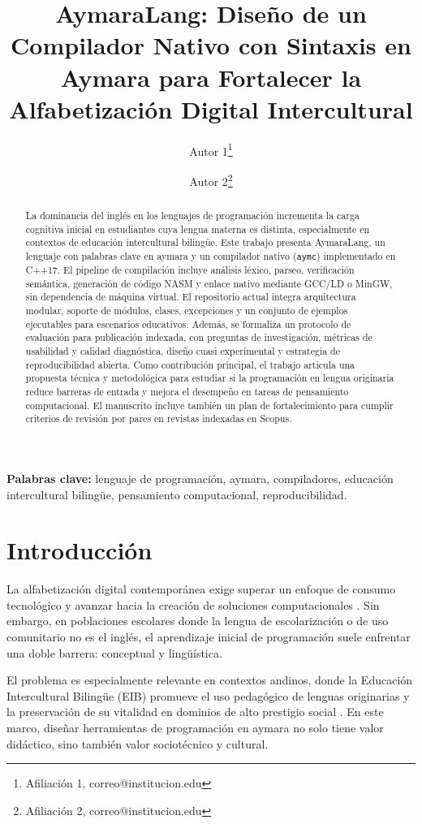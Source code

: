 \documentclass[11pt,a4paper]{article}
\title{AymaraLang: Dise\~no de un Compilador Nativo con Sintaxis en Aymara para Fortalecer la Alfabetizaci\'on Digital Intercultural}
\author{Autor 1\thanks{Afiliaci\'on 1, correo@institucion.edu} \and Autor 2\thanks{Afiliaci\'on 2, correo@institucion.edu}}
\date{}
\begin{document}
\maketitle

\begin{abstract}
La dominancia del ingl\'es en los lenguajes de programaci\'on incrementa la carga cognitiva inicial en estudiantes cuya lengua materna es distinta, especialmente en contextos de educaci\'on intercultural biling\"ue. Este trabajo presenta AymaraLang, un lenguaje con palabras clave en aymara y un compilador nativo (\texttt{aymc}) implementado en C++17. El pipeline de compilaci\'on incluye an\'alisis l\'exico, parseo, verificaci\'on sem\'antica, generaci\'on de c\'odigo NASM y enlace nativo mediante GCC/LD o MinGW, sin dependencia de m\'aquina virtual. El repositorio actual integra arquitectura modular, soporte de m\'odulos, clases, excepciones y un conjunto de ejemplos ejecutables para escenarios educativos. Adem\'as, se formaliza un protocolo de evaluaci\'on para publicaci\'on indexada, con preguntas de investigaci\'on, m\'etricas de usabilidad y calidad diagn\'ostica, dise\~no cuasi experimental y estrategia de reproducibilidad abierta. Como contribuci\'on principal, el trabajo articula una propuesta t\'ecnica y metodol\'ogica para estudiar si la programaci\'on en lengua originaria reduce barreras de entrada y mejora el desempe\~no en tareas de pensamiento computacional. El manuscrito incluye tambi\'en un plan de fortalecimiento para cumplir criterios de revisi\'on por pares en revistas indexadas en Scopus.
\end{abstract}

\textbf{Palabras clave:} lenguaje de programaci\'on, aymara, compiladores, educaci\'on intercultural biling\"ue, pensamiento computacional, reproducibilidad.

\section{Introducci\'on}
La alfabetizaci\'on digital contempor\'anea exige superar un enfoque de consumo tecnol\'ogico y avanzar hacia la creaci\'on de soluciones computacionales \cite{martinez2021,garcia2020}. Sin embargo, en poblaciones escolares donde la lengua de escolarizaci\'on o de uso comunitario no es el ingl\'es, el aprendizaje inicial de programaci\'on suele enfrentar una doble barrera: conceptual y ling\"u\'istica.

El problema es especialmente relevante en contextos andinos, donde la Educaci\'on Intercultural Biling\"ue (EIB) promueve el uso pedag\'ogico de lenguas originarias y la preservaci\'on de su vitalidad en dominios de alto prestigio social \cite{lopez2009,unesco2020,zajicova2017}. En este marco, dise\~nar herramientas de programaci\'on en aymara no solo tiene valor did\'actico, sino tambi\'en valor sociot\'ecnico y cultural.
\end{document}
